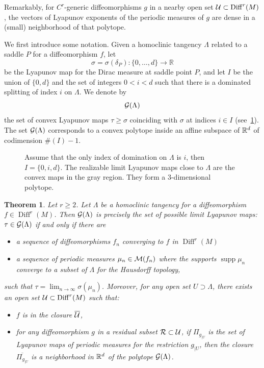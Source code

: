 \documentclass[11pt, a4paper]{amsart}
\theoremstyle{plain}
\newtheorem{theorem}{Theorem} %
\theoremstyle{definition}
\theoremstyle{remark}
\numberwithin{equation}{section}         %
\DeclareMathOperator{\Diff}{{Diff}}
\DeclareMathOperator*{\supp}{supp}
\def\Diff{\operatorname{Diff}}
\begin{document}
Remarkably, for $C^r$-generic diffeomorphisms $g$ in a nearby open set $\cU\subset \Diff^r(M)$, the vectors of Lyapunov exponents of the periodic measures of $g$ are dense in a (small) neighborhood of  that polytope.

\medskip

We first introduce some notation. Given a homoclinic tangency $\Lambda$ related to a saddle $P$ for a diffeomorphism $f$, let 
$$\sigma=\sigma(\delta_P)\colon \{0,\ldots,d\}\to \mathbb{R}$$ be the Lyapunov map 
for the Dirac measure at saddle point $P$, and let $I$ be the union of $\{0,d\}$ and the set of integers $0< i< d$ such that there is a dominated splitting of index $i$ on $\Lambda$. We denote by 
$${\mathcal G}(\Lambda)$$ 
the set of convex Lyapunov maps $\tau\geq \sigma$ coinciding with $\sigma$ at indices $i\in I$ (see~\cref{f.lyapunovmap}). The set ${\mathcal G}(\Lambda)$ corresponds to a convex polytope inside an affine subspace of ${\mathbb R}^d$ of codimension $\# (I)-1$.

\begin{figure}%
\begin{center}
\def\svgwidth{140pt}           %

\end{center}
\caption{\small Assume that the only index of domination on $\Lambda$ is $i$, then $I=\{0,i,d\}$. The realizable limit Lyapunov maps close to $\Lambda$ are the convex maps in the gray region. They form a 3-dimensional polytope.}
\label{f.lyapunovmap}
\end{figure} 


\begin{theorem}\label{t.Lyaptang}
Let $r\geq 2$. Let $\Lambda$ be a homoclinic tangency for a diffeomorphism $f\in \Diff^r(M)$.
Then ${\mathcal G}(\Lambda)$ is precisely the set of possible limit Lyapunov maps: $\tau\in {\mathcal G}(\Lambda)$ if and only if there are
\begin{itemize}
\item a sequence of diffeomorphisms $f_n$ converging to $f$ in $\Diff^r(M)$
\item a sequence of periodic measures $\mu_n\in {\mathcal M}(f_n)$ where the supports $\supp \mu_n$ converge to a subset of $\Lambda$ for the Hausdorff topology,
\end{itemize}
such that $\tau=\lim_{n\to \infty}\sigma(\mu_n)$. Moreover, for any open set  $U\supset \Lambda$, there exists an open set $\cU\subset \Diff^r(M)$
such that:
\begin{itemize}
\item $f$ is in the closure $\overline{{\mathcal U}}$,
\item for any diffeomorphism $g$ in a residual subset ${\mathcal R}\subset {\mathcal U}$, if $\Pi_{g_{|U}}$ is the set of Lyapunov maps of periodic measures for the restriction $g_{|U}$, then the closure $\overline{\Pi_{g_{|U}}}$ is a neighborhood  in ${\mathbb R}^d$ of the polytope ${\mathcal G}(\Lambda)$.
\end{itemize}
\end{theorem}
\end{document}
